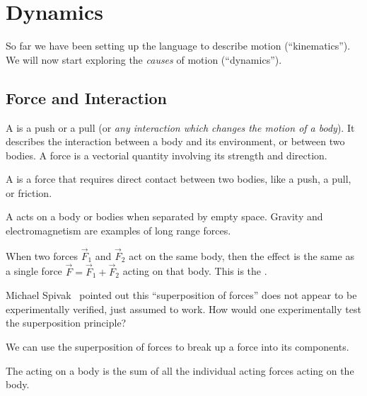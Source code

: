 \section{Dynamics}

\M
So far we have been setting up the language to describe motion
(``kinematics''). We will now start exploring the \emph{causes} of
motion (``dynamics'').

\subsection{Force and Interaction}

\begin{definition}
A  is a push or a pull (or \emph{any
interaction which changes the motion of a body}). It describes the interaction
between a body and its environment, or between two bodies. A force is a
vectorial quantity involving its strength and direction.
\end{definition}

\begin{definition}
A  is a force that requires
direct contact between two bodies, like a push, a pull, or friction.
\end{definition}
\begin{definition}
A  acts on a body or
bodies when separated by empty space. Gravity and electromagnetism are
examples of long range forces.
\end{definition}

When two forces $\vec{F}_{1}$ and $\vec{F}_{2}$ act on the same body,
then the effect is the same as a single force
$\vec{F}=\vec{F}_{1}+\vec{F}_{2}$ acting on that body. This is the
.

\begin{remark}
Michael Spivak~\cite{spivak} pointed out this ``superposition of forces''
does not appear to be experimentally verified, just assumed to work. How
would one experimentally test the superposition principle?
\end{remark}
\begin{remark}
We can use the superposition of forces to break up a force into its
components.
\end{remark}

\begin{definition}
The  acting on a body is the sum of all the individual
acting forces acting on the body.
\end{definition}

